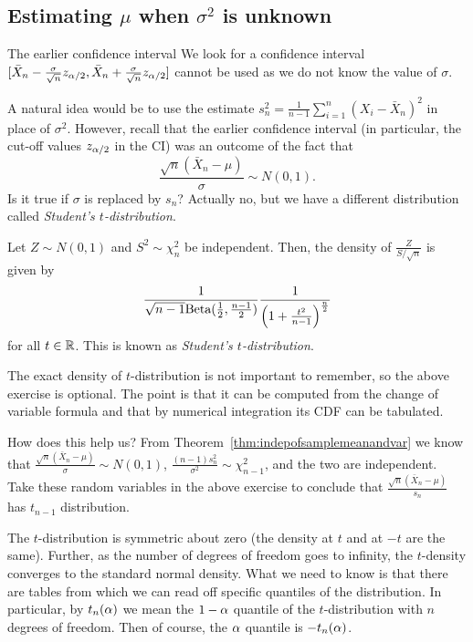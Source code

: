 \documentclass[preprint,  11pt]{amsart}
\def\sig{{\sigma}}
\begin{document}
\subsection{Estimating $\mu$ when $\sig^{2}$ is unknown} The earlier confidence interval We look for a confidence interval $[\bar{X}_{n}-\frac{\sig}{\sqrt{n}}z_{\alp/2},\bar{X}_{n}+\frac{\sig}{\sqrt{n}}z_{\alp/2}]$ cannot be used as we do not know the value of $\sig$.

A natural idea would be to use the estimate $s_{n}^{2}=\frac{1}{n-1}\sum_{i=1}^{n}(X_{i}-\bar{X}_{n})^{2}$ in place of $\sig^{2}$. However, recall that the earlier confidence interval (in particular,  the cut-off values $z_{\alpha/2}$ in the CI)  was an outcome of the fact that
$$
\frac{\sqrt{n}(\bar{X}_{n}-\mu)}{\sig}\sim N(0,1).
$$
Is it true if $\sig$ is replaced by $s_{n}$? Actually no, but we have a different distribution called {\em Student's $t$-distribution}.

\begin{exercise} Let $Z\sim N(0,1)$ and $S^{2}\sim \chi^{2}_{n}$ be independent. Then, the density of $\frac{Z}{S/\sqrt{n}}$ is given by
$$
\frac{1}{\sqrt{n-1}\mbox{Beta}(\frac{1}{2},\frac{n-1}{2})}\frac{1}{\left(1+\frac{t^{2}}{n-1}\right)^{\frac{n}{2}}}
$$
for all $t\in \mathbb{R}$. This is known as {\em Student's $t$-distribution}.
\end{exercise}
The exact density of  $t$-distribution is not important to remember, so the above exercise is optional. The point is that it can be computed from the change of variable formula and that by numerical integration its CDF can be tabulated.

How does this help us? From Theorem~\ref{thm:indepofsamplemeanandvar} we know that $\frac{\sqrt{n}(\bar{X}_{n}-\mu)}{\sig}\sim N(0,1)$, $\frac{(n-1)s_{n}^{2}}{\sig^{2}}\sim \chi^{2}_{n-1}$, and the two are independent. Take these random variables in the above exercise to conclude that $\frac{\sqrt{n}(\bar{X}_{n}-\mu)}{s_{n}}$ has $t_{n-1}$ distribution.


The $t$-distribution is symmetric about zero (the density at $t$ and at $-t$ are the same). Further, as the number of degrees of freedom goes to infinity, the $t$-density converges to the standard normal density. What we need to know is that there are tables from which we can read off specific quantiles of the distribution. In particular, by $t_{n}(\alpha)$ we mean the $1-\alpha$ quantile of the $t$-distribution with $n$ degrees of freedom. Then of course, the $\alpha$ quantile is $-t_{n}(\alpha)$.
\end{document}
